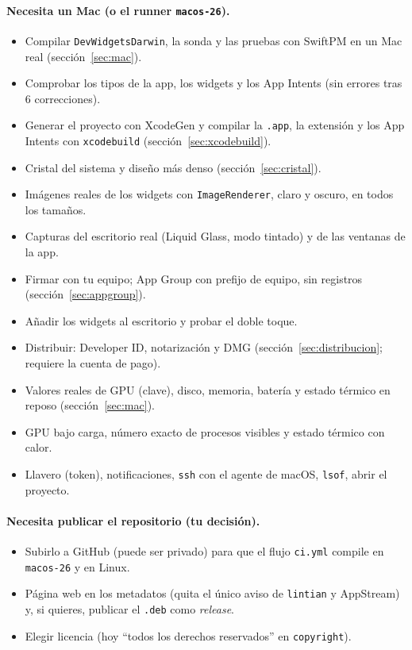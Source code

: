 \documentclass[11pt,a4paper]{article}
\begin{document}
\paragraph{Necesita un Mac (o el runner \texttt{macos-26}).}
\begin{itemize}
  \item[$\checkmark$] Compilar \texttt{DevWidgetsDarwin}, la sonda y
    las pruebas con SwiftPM en un Mac real (sección~\ref{sec:mac}).
  \item[$\checkmark$] Comprobar los tipos de la app, los widgets y los
    App Intents (sin errores tras 6 correcciones).
  \item[$\checkmark$] Generar el proyecto con XcodeGen y compilar la
    \texttt{.app}, la extensión y los App Intents con
    \texttt{xcodebuild} (sección~\ref{sec:xcodebuild}).
  \item[$\checkmark$] Cristal del sistema y diseño más denso
    (sección~\ref{sec:cristal}).
  \item[$\checkmark$] Imágenes reales de los widgets con
    \texttt{ImageRenderer}, claro y oscuro, en todos los tamaños.
  \item[$\square$] Capturas del escritorio real (Liquid Glass, modo
    tintado) y de las ventanas de la app.
  \item[$\checkmark$] Firmar con tu equipo; App Group con prefijo de
    equipo, sin registros (sección~\ref{sec:appgroup}).
  \item[$\square$] Añadir los widgets al escritorio y probar el doble
    toque.
  \item[$\square$] Distribuir: Developer ID, notarización y DMG
    (sección~\ref{sec:distribucion}; requiere la cuenta de pago).
  \item[$\checkmark$] Valores reales de GPU (clave), disco, memoria,
    batería y estado térmico en reposo (sección~\ref{sec:mac}).
  \item[$\square$] GPU bajo carga, número exacto de procesos visibles
    y estado térmico con calor.
  \item[$\square$] Llavero (token), notificaciones, \texttt{ssh} con
    el agente de macOS, \texttt{lsof}, abrir el proyecto.
\end{itemize}

\paragraph{Necesita publicar el repositorio (tu decisión).}
\begin{itemize}
  \item[$\square$] Subirlo a GitHub (puede ser privado) para que el
    flujo \texttt{ci.yml} compile en \texttt{macos-26} y en Linux.
  \item[$\square$] Página web en los metadatos (quita el único aviso
    de \texttt{lintian} y AppStream) y, si quieres, publicar el
    \texttt{.deb} como \emph{release}.
  \item[$\square$] Elegir licencia (hoy ``todos los derechos
    reservados'' en \texttt{copyright}).
\end{itemize}
\end{document}
